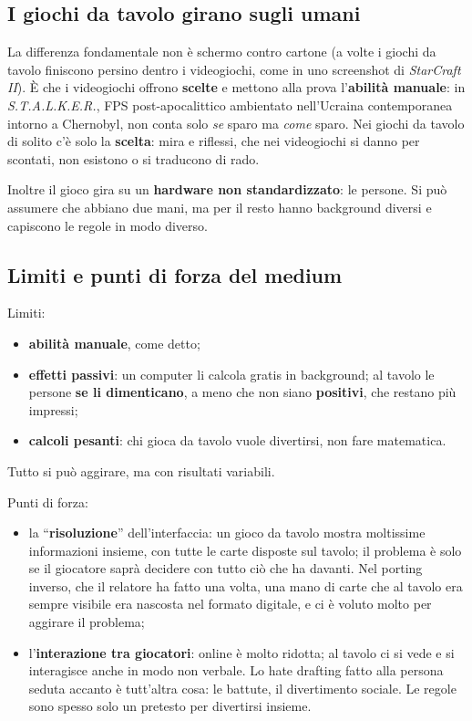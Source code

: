 \subsection{I giochi da tavolo girano sugli umani}

La differenza fondamentale non è schermo contro cartone (a volte i giochi da tavolo
finiscono persino dentro i videogiochi, come in uno screenshot di
\emph{StarCraft II}). È che i videogiochi offrono \textbf{scelte} e mettono alla
prova l'\textbf{abilità manuale}: in \emph{S.T.A.L.K.E.R.}, FPS post-apocalittico
ambientato nell'Ucraina contemporanea intorno a Chernobyl, non conta solo
\emph{se} sparo ma \emph{come} sparo. Nei giochi da tavolo di solito c'è solo la
\textbf{scelta}: mira e riflessi, che nei videogiochi si danno per scontati, non
esistono o si traducono di rado.

Inoltre il gioco gira su un \textbf{hardware non standardizzato}: le persone. Si
può assumere che abbiano due mani, ma per il resto hanno background diversi e
capiscono le regole in modo diverso.

\subsection{Limiti e punti di forza del medium}

Limiti:
\begin{itemize}
  \item \textbf{abilità manuale}, come detto;
  \item \textbf{effetti passivi}: un computer li calcola gratis in background; al
        tavolo le persone \textbf{se li dimenticano}, a meno che non siano
        \textbf{positivi}, che restano più impressi;
  \item \textbf{calcoli pesanti}: chi gioca da tavolo vuole divertirsi, non fare
        matematica.
\end{itemize}
Tutto si può aggirare, ma con risultati variabili.

Punti di forza:
\begin{itemize}
  \item la ``\textbf{risoluzione}'' dell'interfaccia: un gioco da tavolo mostra
        moltissime informazioni insieme, con tutte le carte disposte sul tavolo; il
        problema è solo se il giocatore saprà decidere con tutto ciò che ha davanti.
        Nel porting inverso, che il relatore ha fatto una volta, una mano di carte
        che al tavolo era sempre visibile era nascosta nel formato digitale, e ci è
        voluto molto per aggirare il problema;
  \item l'\textbf{interazione tra giocatori}: online è molto ridotta; al tavolo ci
        si vede e si interagisce anche in modo non verbale. Lo hate drafting fatto
        alla persona seduta accanto è tutt'altra cosa: le battute, il divertimento
        sociale. Le regole sono spesso solo un pretesto per divertirsi insieme.
\end{itemize}

